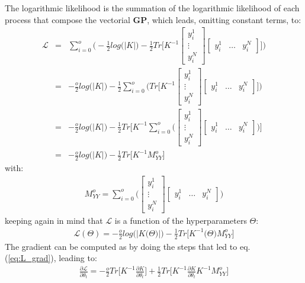 \documentclass{article}
\begin{document}
The logarithmic likelihood is the summation of the logarithmic likelihood of each process that compose the vectorial \textbf{GP}, which leads, omitting constant terms, to:
\begin{eqnarray}
\mathcal{L} &=& 
\sum_{i=0}^o \bigg (
-\frac{1}{2} log \big (\left | K \right | \big )
-\frac{1}{2} Tr \bigg [
K^{-1} 
\begin{bmatrix} y^1_i \\ \vdots \\ y^N_i \end{bmatrix}
\begin{bmatrix} y^1_i & \hdots & y^N_i \end{bmatrix}
\bigg ] \bigg )  \\
&=&
-\frac{o}{2} log \big (\left | K \right | \big )
-\frac{1}{2} \sum_{i=0}^o \bigg ( Tr \bigg [
K^{-1} 
\begin{bmatrix} y^1_i \\ \vdots \\ y^N_i \end{bmatrix}
\begin{bmatrix} y^1_i & \hdots & y^N_i \end{bmatrix}
\bigg ] 
\bigg ) \\
&=&
-\frac{o}{2} log \big (\left | K \right | \big )
-\frac{1}{2} Tr \bigg [
K^{-1} \sum_{i=0}^o \bigg (
\begin{bmatrix} y^1_i \\ \vdots \\ y^N_i \end{bmatrix}
\begin{bmatrix} y^1_i & \hdots & y^N_i \end{bmatrix}
\bigg )
\bigg ] \\
&=&
-\frac{o}{2} log \big (\left | K \right | \big )
-\frac{1}{2} Tr \bigg [
K^{-1} M^o_{YY}
\bigg ] 
\end{eqnarray}
with:
\begin{eqnarray}
M^o_{YY} = \sum_{i=0}^o \bigg (
\begin{bmatrix} y^1_i \\ \vdots \\ y^N_i \end{bmatrix}
\begin{bmatrix} y^1_i & \hdots & y^N_i \end{bmatrix}
\bigg )
\end{eqnarray}
keeping again in mind that $\mathcal{L}$ is a function of the hyperparameters $\Theta$:
\begin{eqnarray}
\mathcal{L}(\Theta) = -\frac{o}{2} log \big (\left | K \big (\Theta \big ) \right | \big )
-\frac{1}{2} Tr \bigg [
K^{-1}\big (\Theta \big ) M^o_{YY}
\bigg ] 
\end{eqnarray}
The gradient can be computed as by doing the steps that led to 
eq. (\ref{eq:L_grad}), leading to:
\begin{eqnarray}
\frac{\partial \mathcal{L}}{\partial \theta_t} = 
-\frac{o}{2} Tr \bigg [ K^{-1} \frac{\partial K}{\partial \theta_t} \bigg ]
+\frac{1}{2} Tr \bigg [ K^{-1} \frac{\partial K}{\partial \theta_t} K^{-1} M^o_{YY} \bigg ]
\end{eqnarray}
\end{document}
